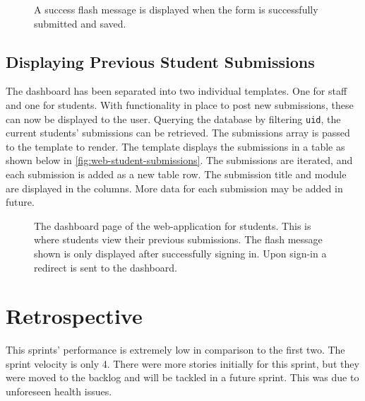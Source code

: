 \begin{figure}[H]
  \centering
  \caption[Web New Submission Success]{A success flash message is displayed when the form is successfully submitted and saved.}
  \label{fig:web-new-submission-success}
\end{figure}

\subsection{Displaying Previous Student Submissions}
The dashboard has been separated into two individual templates. One for staff and one for students. With functionality in place to post new submissions, these can now be displayed to the user. Querying the database by filtering \texttt{uid}, the current students' submissions can be retrieved. The submissions array is passed to the template to render. The template displays the submissions in a table as shown below in \autoref{fig:web-student-submissions}. The submissions are iterated, and each submission is added as a new table row. The submission title and module are displayed in the columns. More data for each submission may be added in future.

\begin{figure}[H]
  \centering
  \caption[Web New Submission Page]{The dashboard page of the web-application for students. This is where students view their previous submissions. The flash message shown is only displayed after successfully signing in. Upon sign-in a redirect is sent to the dashboard.}
  \label{fig:web-student-submissions}
\end{figure}

\section{Retrospective}
This sprints' performance is extremely low in comparison to the first two. The sprint velocity is only 4. There were more stories initially for this sprint, but they were moved to the backlog and will be tackled in a future sprint. This was due to unforeseen health issues.
